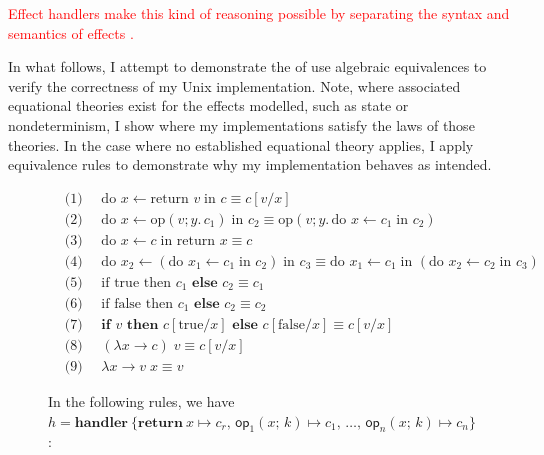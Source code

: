 \documentclass[logo,bsc,singlespacing,parskip]{infthesis}
\begin{document}
\textcolor{red}{Effect handlers make this kind of reasoning possible by separating the syntax and semantics of effects \cite{TheLogicAndHandlingOfAlgebraicEffects}. }

In what follows, I attempt to demonstrate the of use algebraic equivalences to verify the correctness of my Unix implementation. Note, where associated equational theories exist for the effects modelled, such as state or nondeterminism, I show where my implementations satisfy the laws of those theories. In the case where no established equational theory applies, I apply equivalence rules to demonstrate why my implementation behaves as intended.


\begin{figure}[H]
    \centering
    \begin{tcolorbox}[colframe=black, colback=white, sharp corners]
    \begin{align*}
        &\text{(1) } \quad \text{do } x \leftarrow \text{return } v \; \text{in } c \equiv c[v/x] \\
        &\text{(2) } \quad \text{do } x \leftarrow \text{op}(v; y.\, c_1) \; \text{in } c_2 \equiv \text{op}(v; y.\, \text{do } x \leftarrow c_1 \; \text{in } c_2) \\
        &\text{(3) } \quad \text{do } x \leftarrow c \; \text{in return } x \equiv c \\
        &\text{(4) } \quad \text{do } x_2 \leftarrow (\text{do } x_1 \leftarrow c_1 \; \text{in } c_2) \; \text{in } c_3 \equiv \text{do } x_1 \leftarrow c_1 \; \text{in } (\text{do } x_2 \leftarrow c_2 \; \text{in } c_3) \\
        &\text{(5) } \quad \text{if true then } c_1 \textbf{ else } c_2 \equiv c_1 \\
        &\text{(6) } \quad \text{if false then } c_1 \textbf{ else } c_2 \equiv c_2 \\
        &\text{(7) } \quad \textbf{if } v \textbf{ then } c[\text{true}/x] \textbf{ else } c[\text{false}/x] \equiv c[v/x] \\
        &\text{(8) } \quad (\lambda x \rightarrow c) \; v \equiv c[v/x] \\
        &\text{(9) } \quad \lambda x \rightarrow v \; x \equiv v 
    \end{align*}
    \end{tcolorbox}
In the following rules, we have \( h = \mathbf{handler}\ \{ \mathbf{return}\ x \mapsto c_r,\, \mathsf{op}_1(x;\,k) \mapsto c_1,\, \ldots,\, \mathsf{op}_n(x;\,k) \mapsto c_n \} \):
    \begin{tcolorbox}[colframe=black, colback=white, sharp corners]

\end{tcolorbox}
\end{figure}
\end{document}
